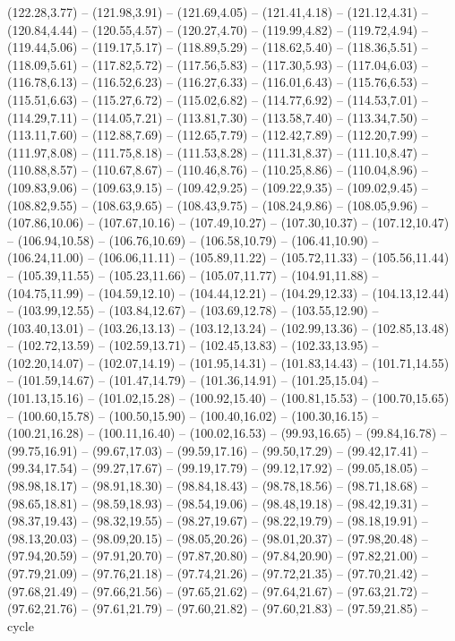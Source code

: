 {  (122.28,3.77) -- (121.98,3.91) -- (121.69,4.05) -- (121.41,4.18) -- (121.12,4.31) -- (120.84,4.44) -- (120.55,4.57) --
  (120.27,4.70) -- (119.99,4.82) -- (119.72,4.94) -- (119.44,5.06) -- (119.17,5.17) -- (118.89,5.29) -- (118.62,5.40) --
  (118.36,5.51) -- (118.09,5.61) -- (117.82,5.72) -- (117.56,5.83) -- (117.30,5.93) -- (117.04,6.03) -- (116.78,6.13) --
  (116.52,6.23) -- (116.27,6.33) -- (116.01,6.43) -- (115.76,6.53) -- (115.51,6.63) -- (115.27,6.72) -- (115.02,6.82) --
  (114.77,6.92) -- (114.53,7.01) -- (114.29,7.11) -- (114.05,7.21) -- (113.81,7.30) -- (113.58,7.40) -- (113.34,7.50) --
  (113.11,7.60) -- (112.88,7.69) -- (112.65,7.79) -- (112.42,7.89) -- (112.20,7.99) -- (111.97,8.08) -- (111.75,8.18) --
  (111.53,8.28) -- (111.31,8.37) -- (111.10,8.47) -- (110.88,8.57) -- (110.67,8.67) -- (110.46,8.76) -- (110.25,8.86) --
  (110.04,8.96) -- (109.83,9.06) -- (109.63,9.15) -- (109.42,9.25) -- (109.22,9.35) -- (109.02,9.45) -- (108.82,9.55) --
  (108.63,9.65) -- (108.43,9.75) -- (108.24,9.86) -- (108.05,9.96) -- (107.86,10.06) -- (107.67,10.16) -- (107.49,10.27) --
  (107.30,10.37) -- (107.12,10.47) -- (106.94,10.58) -- (106.76,10.69) -- (106.58,10.79) -- (106.41,10.90) -- (106.24,11.00) --
  (106.06,11.11) -- (105.89,11.22) -- (105.72,11.33) -- (105.56,11.44) -- (105.39,11.55) -- (105.23,11.66) -- (105.07,11.77) --
  (104.91,11.88) -- (104.75,11.99) -- (104.59,12.10) -- (104.44,12.21) -- (104.29,12.33) -- (104.13,12.44) -- (103.99,12.55) --
  (103.84,12.67) -- (103.69,12.78) -- (103.55,12.90) -- (103.40,13.01) -- (103.26,13.13) -- (103.12,13.24) -- (102.99,13.36) --
  (102.85,13.48) -- (102.72,13.59) -- (102.59,13.71) -- (102.45,13.83) -- (102.33,13.95) -- (102.20,14.07) -- (102.07,14.19) --
  (101.95,14.31) -- (101.83,14.43) -- (101.71,14.55) -- (101.59,14.67) -- (101.47,14.79) -- (101.36,14.91) -- (101.25,15.04) --
  (101.13,15.16) -- (101.02,15.28) -- (100.92,15.40) -- (100.81,15.53) -- (100.70,15.65) -- (100.60,15.78) -- (100.50,15.90) --
  (100.40,16.02) -- (100.30,16.15) -- (100.21,16.28) -- (100.11,16.40) -- (100.02,16.53) -- (99.93,16.65) -- (99.84,16.78) --
  (99.75,16.91) -- (99.67,17.03) -- (99.59,17.16) -- (99.50,17.29) -- (99.42,17.41) -- (99.34,17.54) -- (99.27,17.67) --
  (99.19,17.79) -- (99.12,17.92) -- (99.05,18.05) -- (98.98,18.17) -- (98.91,18.30) -- (98.84,18.43) -- (98.78,18.56) --
  (98.71,18.68) -- (98.65,18.81) -- (98.59,18.93) -- (98.54,19.06) -- (98.48,19.18) -- (98.42,19.31) -- (98.37,19.43) --
  (98.32,19.55) -- (98.27,19.67) -- (98.22,19.79) -- (98.18,19.91) -- (98.13,20.03) -- (98.09,20.15) -- (98.05,20.26) --
  (98.01,20.37) -- (97.98,20.48) -- (97.94,20.59) -- (97.91,20.70) -- (97.87,20.80) -- (97.84,20.90) -- (97.82,21.00) --
  (97.79,21.09) -- (97.76,21.18) -- (97.74,21.26) -- (97.72,21.35) -- (97.70,21.42) -- (97.68,21.49) -- (97.66,21.56) --
  (97.65,21.62) -- (97.64,21.67) -- (97.63,21.72) -- (97.62,21.76) -- (97.61,21.79) -- (97.60,21.82) -- (97.60,21.83) --
  (97.59,21.85) -- cycle}
